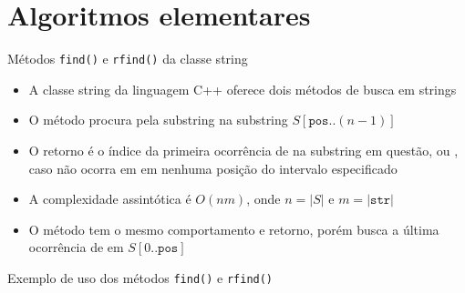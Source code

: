 \section{Algoritmos elementares}

\begin{frame}[fragile]{Métodos {\tt find()} e {\tt rfind()} da classe string}

    \begin{itemize}
        \item A classe string da linguagem C++ oferece dois métodos de busca em strings
        \pause

        \item O método  procura pela substring  na 
            substring $S[\mathtt{pos}..(n - 1)]$
        \vspace{.1in}
        \vspace{.1in}
        \pause

        \item O retorno é o índice da primeira ocorrência de  na substring em
            questão, ou , caso  não ocorra em
            em nenhuma posição do intervalo especificado
        \pause

        \item A complexidade assintótica é $O(nm)$, onde $n = |S|$ e $m = |\mathtt{str}|$
        \pause

        \item O método  tem o mesmo comportamento e retorno, porém busca
            a última ocorrência de  em $S[0..\mathtt{pos}]$

        \vspace{.1in}
        \vspace{.1in}
    \end{itemize}

\end{frame}

\begin{frame}[fragile]{Exemplo de uso dos métodos {\tt find()} e {\tt rfind()}}
\end{frame}

